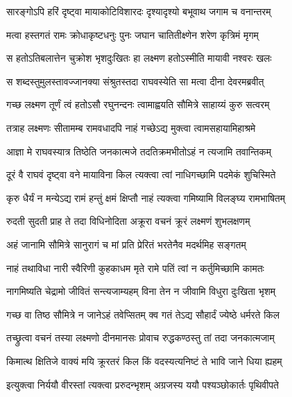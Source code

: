 \twolineshloka
{सारङ्गोऽपि हरिं दृष्ट्वा मायाकोटिविशारदः}
{दृश्यादृश्यो बभूवाथ जगाम च वनान्तरम्}%

\twolineshloka
{मत्वा हस्तगतं रामः क्रोधाकृष्टधनुः पुनः}
{जघान चातितीक्ष्णेन शरेण कृत्रिमं मृगम्}%

\twolineshloka
{स हतोऽतिबलात्तेन चुक्रोश भृशदुःखितः}
{हा लक्ष्मण हतोऽस्मीति मायावी नश्वरः खलः}%

\twolineshloka
{स शब्दस्तुमुलस्तावज्जानक्या संश्रुतस्तदा}
{राघवस्येति सा मत्वा दीना देवरमब्रवीत्}%

\twolineshloka
{गच्छ लक्ष्मण तूर्णं त्वं हतोऽसौ रघुनन्दनः}
{त्वामाह्वयति सौ‌मित्रे साहाय्यं कुरु सत्वरम्}%

\twolineshloka
{तत्राह लक्ष्मणः सीतामम्ब रामवधादपि}
{नाहं गच्छेऽद्य मुक्त्वा त्वामसहायामिहाश्रमे}%

\twolineshloka
{आज्ञा मे राघवस्यात्र तिष्ठेति जनकात्मजे}
{तदतिक्रमभीतोऽहं न त्यजामि तवान्तिकम्}%

\twolineshloka
{दूरं वै राघवं दृष्ट्वा वने मायाविना किल}
{त्यक्त्वा त्वां नाधिगच्छामि पदमेकं शुचिस्मिते}%

\twolineshloka
{कृरु धैर्यं न मन्येऽद्य रामं हन्तुं क्षमं क्षिप्तौ}
{नाहं त्यक्त्वा गमिष्यामि विलङ्घ्य रामभाषितम्}%



\twolineshloka
{रुदती सुदती प्राह ते तदा विधिनोदिता}
{अक्रूरा वचनं क्रूरं लक्ष्मणं शुभलक्षणम्}%

\twolineshloka
{अहं जानामि सौ‌मित्रे सानुरागं च मां प्रति}
{प्रेरितं भरतेनैव मदर्थमिह सङ्गतम्}%

\twolineshloka
{नाहं तथाविधा नारी स्वैरिणी कुहकाधम}
{मृते रामे पतिं त्वां न कर्तुमिच्छामि कामतः}%

\twolineshloka
{नागमिष्यति चेद्रामो जीवितं सन्त्यजाम्यहम्}
{विना तेन न जीवामि विधुरा दुःखिता भृशम्}%

\twolineshloka
{गच्छ वा तिष्ठ सौ‍मित्रे न जानेऽहं तवेप्सितम्}
{क्व गतं तेऽद्य सौहार्दं ज्येष्ठे धर्मरते किल}%

\twolineshloka
{तच्छ्रुत्वा वचनं तस्या लक्ष्मणो दीनमानसः}
{प्रोवाच रुद्धकण्ठस्तु तां तदा जनकात्मजाम्}%

\twolineshloka
{किमात्थ क्षितिजे वाक्यं मयि क्रूरतरं किल}
{किं वदस्यत्यनिष्टं ते भावि जाने धिया ह्यहम्}%

\twolineshloka
{इत्युक्त्वा निर्ययौ वीरस्तां त्यक्त्वा प्ररुदन्भृशम्}
{अग्रजस्य ययौ पश्यञ्छोकार्तः पृथिवीपते}%

